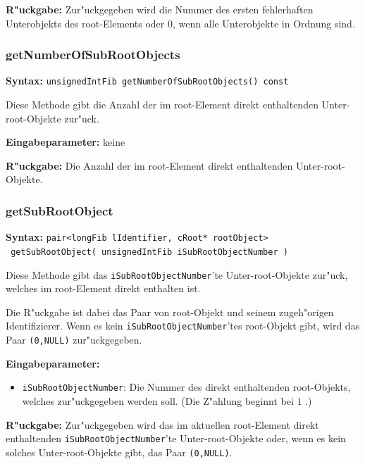 \bigskip\noindent
\textbf{R"uckgabe:} Zur"uckgegeben wird die Nummer des ersten fehlerhaften Unterobjekts des root-Elements oder $0$, wenn alle Unterobjekte in Ordnung sind.



\subsubsection{getNumberOfSubRootObjects}

\textbf{Syntax:} \verb|unsignedIntFib getNumberOfSubRootObjects() const|

\bigskip\noindent
Diese Methode gibt die Anzahl der im root-Element direkt enthaltenden Unter-root-Objekte zur"uck.

\bigskip\noindent
\textbf{Eingabeparameter:} keine

\bigskip\noindent
\textbf{R"uckgabe:} Die Anzahl der im root-Element direkt enthaltenden Unter-root-Objekte.


\subsubsection{getSubRootObject}

\textbf{Syntax:} \verb|pair<longFib lIdentifier, cRoot* rootObject> | \\\verb| getSubRootObject( unsignedIntFib iSubRootObjectNumber )|

\bigskip\noindent
Diese Methode gibt das \verb|iSubRootObjectNumber|'te Unter-root-Objekte zur"uck, welches im root-Element direkt enthalten ist.

Die R"uckgabe ist dabei das Paar von root-Objekt und seinem zugeh"origen Identifizierer. Wenn es kein \verb|iSubRootObjectNumber|'tes root-Objekt gibt, wird das Paar \verb|(0,NULL)| zur"uckgegeben.

\bigskip\noindent
\textbf{Eingabeparameter:}
\begin{itemize}
 \item \verb|iSubRootObjectNumber|: Die Nummer des direkt enthaltenden root-Objekts, welches zur"uckgegeben werden soll. (Die Z"ahlung beginnt bei $1$ .)
\end{itemize}

\bigskip\noindent
\textbf{R"uckgabe:} Zur"uckgegeben wird das im aktuellen root-Element direkt enthaltenden \verb|iSubRootObjectNumber|'te Unter-root-Objekte oder, wenn es kein solches Unter-root-Objekte gibt, das Paar \verb|(0,NULL)|.


